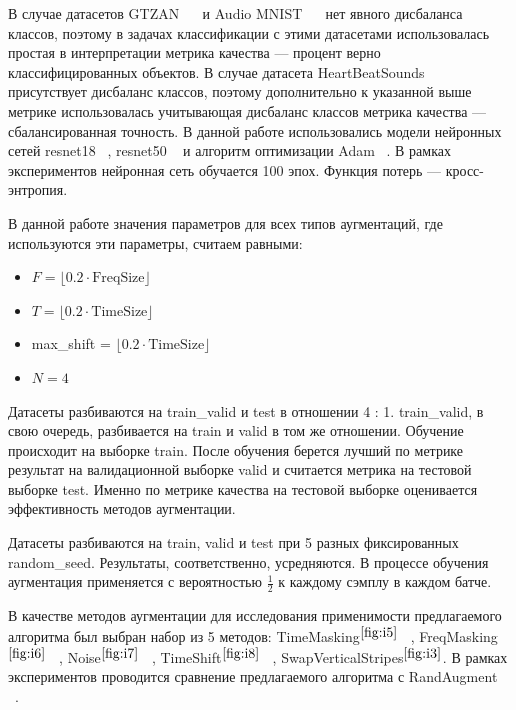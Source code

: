 \documentclass[12pt, fleqn]{article}
\begin{document}
В случае датасетов GTZAN ~\cite{GTZAN_Article}~\cite{GTZAN_kaggle} и Audio MNIST ~\cite{AudioMnistArticle}~\cite{AudioMnistKaggle} нет явного дисбаланса классов, поэтому в задачах классификации с этими датасетами использовалась простая в интерпретации метрика качества --- процент верно классифицированных объектов. В случае датасета HeartBeatSounds ~\cite{HeartbeatSoundsArticle}~\cite{HeartbeatSoundsKaggle} присутствует дисбаланс классов, поэтому дополнительно к указанной выше метрике использовалась учитывающая дисбаланс классов метрика качества --- сбалансированная точность. В данной работе использовались модели нейронных сетей resnet18 ~\cite{Resnet}, resnet50 ~\cite{Resnet} и алгоритм оптимизации Adam ~\cite{Adam}. В рамках экспериментов нейронная сеть обучается 100 эпох. Функция потерь --- кросс-энтропия. 
	
В данной работе значения параметров для всех типов аугментаций, где используются эти параметры, считаем равными: 
\begin{itemize}
    \item $F = \lfloor 0.2 \cdot \text{FreqSize} \rfloor$
    \item $T = \lfloor 0.2 \cdot \text{TimeSize} \rfloor$
    \item max\_shift = $\lfloor 0.2 \cdot \text{TimeSize} \rfloor$
    \item $N = 4$
\end{itemize}

Датасеты разбиваются на train\_valid и test в отношении 4 : 1. train\_valid, в свою очередь, разбивается на train и valid в том же отношении. Обучение происходит на выборке train. После обучения берется лучший по метрике результат на валидационной выборке valid и считается метрика на тестовой выборке test. Именно по метрике качества на тестовой выборке оценивается эффективность методов аугментации.
	
Датасеты разбиваются на train, valid и test при 5 разных фиксированных random\_seed. Результаты, соответственно, усредняются. В процессе обучения аугментация применяется с вероятностью $\frac{1}{2}$ к каждому сэмплу в каждом батче.

В качестве методов аугментации для исследования применимости предлагаемого алгоритма был выбран набор из 5 методов: TimeMasking$^{\ref{fig:i5}}$ ~\cite{SpecAugment}, FreqMasking$^{\ref{fig:i6}}$ ~\cite{SpecAugment}, Noise$^{\ref{fig:i7}}$ ~\cite{AudioClassification}, TimeShift$^{\ref{fig:i8}}$ ~\cite{AudioClassification}, SwapVerticalStripes$^{\ref{fig:i3}}$. В рамках экспериментов проводится сравнение предлагаемого алгоритма с RandAugment ~\cite{RandAugment}.
\end{document}

